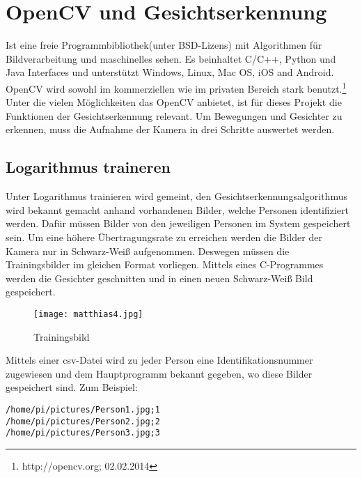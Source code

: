 \section{OpenCV und Gesichtserkennung}

Ist eine freie Programmbibliothek(unter BSD-Lizens) mit Algorithmen für Bildverarbeitung und maschinelles sehen. Es beinhaltet C/C++, Python und Java Interfaces und unterstützt Windows, Linux, Mac OS, iOS and Android. OpenCV wird sowohl im kommerziellen wie im privaten Bereich stark benutzt.\footnote{http://opencv.org; 02.02.2014}\\

Unter die vielen Möglichkeiten das OpenCV anbietet, ist für dieses Projekt die Funktionen der Gesichtserkennung relevant. Um Bewegungen und Gesichter zu erkennen, muss die Aufnahme der Kamera in drei Schritte auswertet werden. 


\subsection{Logarithmus traineren}
Unter Logarithmus trainieren wird gemeint, den Gesichtserkennungsalgorithmus wird bekannt gemacht anhand vorhandenen Bilder, welche Personen identifiziert werden. Dafür müssen Bilder von den jeweiligen Personen im System gespeichert sein. Um eine höhere Übertragungsrate zu erreichen werden die Bilder der Kamera nur in Schwarz-Weiß aufgenommen. Deswegen müssen die Trainingsbilder im gleichen Format vorliegen. Mittels eines C-Programmes werden die Gesichter geschnitten und in einen neuen Schwarz-Weiß Bild gespeichert.\\

\begin{figure}[h]
  \begin{center}		%
    \texttt{[image: matthias4.jpg]}
  		  \caption{Trainingsbild}
     \label{Trainingsbild}
  \end{center}
\end{figure}

\newpage
Mittels einer csv-Datei wird zu jeder Person eine Identifikationsnummer zugewiesen und dem Hauptprogramm bekannt gegeben, wo diese Bilder gespeichert sind. Zum Beispiel:\\

\begin{lstlisting}
/home/pi/pictures/Person1.jpg;1
/home/pi/pictures/Person2.jpg;2
/home/pi/pictures/Person3.jpg;3
\end{lstlisting}


